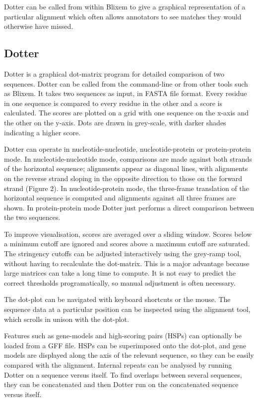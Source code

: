 \documentclass[10pt]{bmc_article}
\newenvironment{bmcformat}{\begin{raggedright}\baselineskip20pt\sloppy\setboolean{publ}{false}}{\end{raggedright}\baselineskip20pt\sloppy}
\begin{document}
\begin{bmcformat}
Dotter can be called from within Blixem to give a graphical representation of a particular alignment which often allows annotators to see matches they would otherwise have missed.

\subsection*{Dotter}
Dotter is a graphical dot-matrix program for detailed comparison of two sequences. Dotter can be called from the command-line or from other tools such as Blixem.  It takes two sequences as input, in FASTA file format.  Every residue in one sequence is compared to every residue in the other and a score is calculated.  The scores are plotted on a grid with one sequence on the x-axis and the other on the y-axis.  Dots are drawn in grey-scale, with darker shades indicating a higher score.

Dotter can operate in nucleotide-nucleotide, nucleotide-protein or protein-protein mode.  In nucleotide-nucleotide mode, comparisons are made against both strands of the horizontal sequence; alignments appear as diagonal lines, with alignments on the reverse strand sloping in the opposite direction to those on the forward strand (Figure 2).  In nucleotide-protein mode, the three-frame translation of the horizontal sequence is computed and alignments against all three frames are shown.  In protein-protein mode Dotter just performs a direct comparison between the two sequences.

To improve visualisation, scores are averaged over a sliding window.  Scores below a minimum cutoff are ignored and scores above a maximum cutoff are saturated.  The stringency cutoffs can be adjusted interactively using the grey-ramp tool, without having to recalculate the dot-matrix.  This is a major advantage because large matrices can take a long time to compute.  It is not easy to predict the correct thresholds programatically, so manual adjustment is often necessary.

The dot-plot can be navigated with keyboard shortcuts or the mouse. The sequence data at a particular position can be inspected using the alignment tool, which scrolls in unison with the dot-plot.

Features such as gene-models and high-scoring pairs (HSPs) can optionally be loaded from a GFF file. HSPs can be superimposed onto the dot-plot, and gene models are displayed along the axis of the relevant sequence, so they can be easily compared with the alignment. Internal repeats can be analysed by running Dotter on a sequence versus itself.  To find overlaps between several sequences, they can be concatenated and then Dotter run on the concatenated sequence versus itself.


\end{bmcformat}
\end{document}
